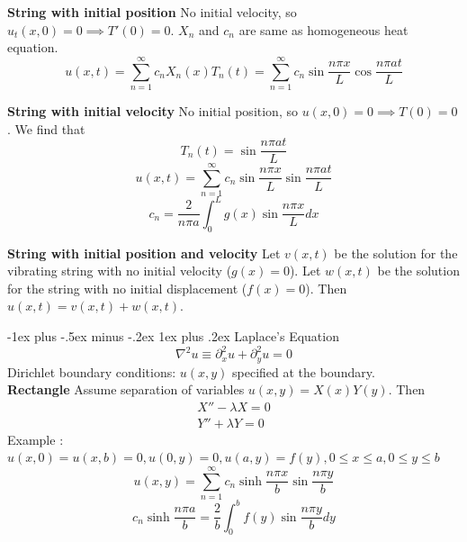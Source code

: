 \documentclass[10pt,landscape]{article}
\makeatletter
\renewcommand{\subsubsection}{\@startsection{subsubsection}{3}{0mm}%
                                {-1ex plus -.5ex minus -.2ex}%
                                {1ex plus .2ex}%
                                {\normalfont\small\bfseries}}
\newcommand{\lb}{\lambda}
\newcommand{\f}{\frac}
\makeatother
\begin{document}
\begin{multicols}{3}
		\textbf{String with initial position} No initial velocity, so $u_t(x,0) = 0 \implies T'(0) = 0$. $X_n$ and $c_n$ are same as homogeneous heat equation.
		$$ u(x,t) = \sum_{n=1}^{\infty} c_nX_n(x)T_n(t) = \sum_{n=1}^{\infty} c_n \sin{\f{n \pi x}{L}} \cos{\f{n \pi a t}{L}} $$

		\textbf{String with initial velocity} No initial position, so $u(x,0) = 0 \implies T(0) = 0$. We find that $$ T_n(t) = \sin{\f{n \pi a t}{L}}$$
		$$ u(x,t) = \sum_{n=1}^{\infty} c_n \sin{\f{n \pi x}{L}} \sin{\f{n \pi a t}{L}} $$
		$$ c_n = \f{2}{n \pi a} \int_0^L g(x)  \sin{\f{n \pi x}{L}} dx $$

		\textbf{String with initial position and velocity} Let $v(x, t)$ be the solution for the vibrating string with no initial velocity ($g(x) = 0$). Let $w(x, t)$ be the solution for the string with no initial displacement ($f(x) = 0$). Then $u(x, t) = v(x, t) + w(x, t).$

		\subsubsection{Laplace's Equation}
		$$ \nabla^2u \equiv \partial_x^2 u + \partial_y^2 u = 0 $$
		Dirichlet boundary conditions: $u(x,y)$ specified at the boundary. \\
		
		\textbf{Rectangle} Assume separation of variables $u(x,y) = X(x)Y(y)$. Then 
		\begin{align*}
			X'' - \lb X = 0 \\
			Y'' + \lb Y = 0 
		\end{align*}
		Example : $u(x,0)=u(x,b)=0, u(0,y) =0, u(a,y) = f(y), 0 \leq x \leq a, 0 \leq y \leq b$
		$$ u(x,y) =  \sum_{n=1}^{\infty} c_n \sinh{\f{n \pi x}{b}} \sin{\f{n \pi y}{b}} $$
		$$ c_n  \sinh{\f{n \pi a}{b}}  = \f{2}{b} \int_0^b f(y)  \sin{\f{n \pi y}{b}} dy $$


\end{multicols}
\end{document}
